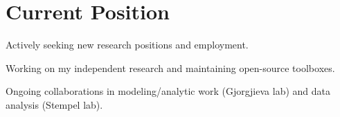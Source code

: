 \documentclass{muratcan_cv}
\begin{document}
\headerview

\vspace{1ex}
%
\section{Current Position}{%
\begin{explanationitems}
  \item Actively seeking new research positions and employment.
  \item Working on my independent research and maintaining open-source toolboxes.
  \item Ongoing collaborations in modeling/analytic work (Gjorgjieva lab) and data analysis (Stempel lab).
\end{explanationitems}
%
}
\end{document}
